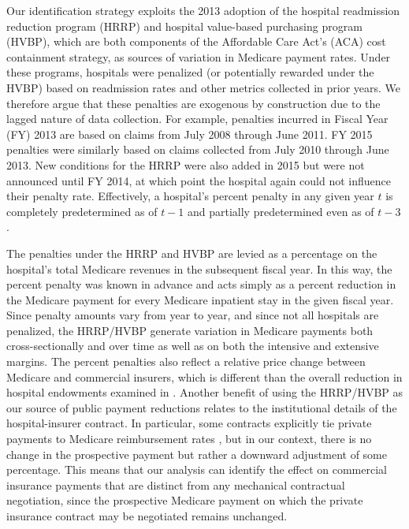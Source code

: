 \documentclass[12pt]{article}
\begin{document}
Our identification strategy exploits the 2013 adoption of the hospital readmission reduction program (HRRP) and hospital value-based purchasing program (HVBP), which are both components of the Affordable Care Act's (ACA) cost containment strategy, as sources of variation in Medicare payment rates. Under these programs, hospitals were penalized (or potentially rewarded under the HVBP) based on readmission rates and other metrics collected in prior years. We therefore argue that these penalties are exogenous by construction due to the lagged nature of data collection. For example, penalties incurred in Fiscal Year (FY) 2013 are based on claims from July 2008 through June 2011. FY 2015 penalties were similarly based on claims collected from July 2010 through June 2013. New conditions for the HRRP were also added in 2015 but were not announced until FY 2014, at which point the hospital again could not influence their penalty rate. Effectively, a hospital's percent penalty in any given year $t$ is completely predetermined as of $t-1$ and partially predetermined even as of $t-3$.

The penalties under the HRRP and HVBP are levied as a percentage on the hospital's total Medicare revenues in the subsequent fiscal year. In this way, the percent penalty was known in advance and acts simply as a percent reduction in the Medicare payment for every Medicare inpatient stay in the given fiscal year. Since penalty amounts vary from year to year, and since not all hospitals are penalized, the HRRP/HVBP generate variation in Medicare payments both cross-sectionally and over time as well as on both the intensive and extensive margins. The percent penalties also reflect a relative price change between Medicare and commercial insurers, which is different than the overall reduction in hospital endowments examined in \cite{dranove2017}. Another benefit of using the HRRP/HVBP as our source of public payment reductions relates to the institutional details of the hospital-insurer contract. In particular, some contracts explicitly tie private payments to Medicare reimbursement rates \citep{cooper2015}, but in our context, there is no change in the prospective payment but rather a downward adjustment of some percentage. This means that our analysis can identify the effect on commercial insurance payments that are distinct from any mechanical contractual negotiation, since the prospective Medicare payment on which the private insurance contract may be negotiated remains unchanged.
\end{document}
